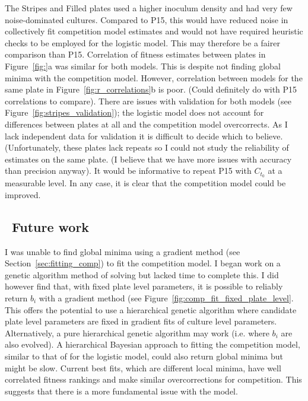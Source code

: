 The Stripes and Filled plates used a higher inoculum density and had
very few noise-dominated cultures. Compared to P15, this would have
reduced noise in collectively fit competition model estimates and
would not have required heuristic checks to be employed for the
logistic model. This may therefore be a fairer comparison than
P15. Correlation of fitness estimates between plates in
Figure~\ref{fig:}a was similar for both models. This is despite not
finding global minima with the competition model. However, correlation
between models for the same plate in Figure~\ref{fig:r_correlations}b
is poor. (Could definitely do with P15 correlations to compare). There
are issues with validation for both models (see
Figure~\ref{fig:stripes_validation}); the logistic model does not
account for differences between plates at all and the competition
model overcorrects. As I lack independent data for validation it is
difficult to decide which to believe. (Unfortunately, these plates
lack repeats so I could not study the reliability of estimates on the
same plate. (I believe that we have more issues with accuracy than
precision anyway). It would be informative to repeat P15 with
\(C_{t_{0}}\) at a measurable level. In any case, it is clear that the
competition model could be improved.


\subsection{\thesubsection~Future work}

I was unable to find global minima using a gradient method (see
Section~\ref{sec:fitting_comp}) to fit the competition model. I began
work on a genetic algorithm method of solving but lacked time to
complete this. I did however find that, with fixed plate level
parameters, it is possible to reliably return \(b_{i}\) with a
gradient method (see Figure~\ref{fig:comp_fit_fixed_plate_level}. This
offers the potential to use a hierarchical genetic algorithm where
candidate plate level parameters are fixed in gradient fits of culture
level parameters. Alternatively, a pure hierarchical genetic algorithm
may work (i.e. where \(b_{i}\) are also evolved). A hierarchical
Bayesian approach to fitting the competition model, similar to that of
\citet{Heydari2016} for the logistic model, could also return global
minima but might be slow. Current best fits, which are different local
minima, have well correlated fitness rankings and make similar
overcorrections for competition. This suggests that there is a more
fundamental issue with the model.

